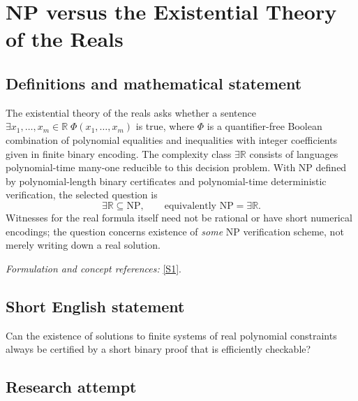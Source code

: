 \documentclass[11pt,a4paper]{article}
\newcommand{\R}{\mathbb{R}}
\newcommand{\sref}[2]{\hyperlink{source:#1:#2}{[S#2]}}
\newif\ifshowcatalogue
\newcommand{\cataloguescope}[1]{\ifshowcatalogue
 \paragraph{Exact scope in the supplied catalogue.}
 \begin{quote}\small #1\end{quote}\fi}
\numberwithin{equation}{section}
\begin{document}
\setcounter{section}{157}
\clearpage
\section{\texorpdfstring{NP versus the Existential Theory of the Reals}{NP versus the Existential Theory of the Reals}}\label{158}
\subsection{Definitions and mathematical statement}
The existential theory of the reals asks whether a sentence
$\exists x_1,\ldots,x_m\in\R\;\Phi(x_1,\ldots,x_m)$ is true, where $\Phi$ is a quantifier-free Boolean combination of polynomial equalities and inequalities with integer coefficients given in finite binary encoding. The complexity class $\exists\R$ consists of languages polynomial-time many-one reducible to this decision problem. With $\mathrm{NP}$ defined by polynomial-length binary certificates and polynomial-time deterministic verification, the selected question is
\[
 \exists\R\subseteq\mathrm{NP},\qquad\text{equivalently }\mathrm{NP}=\exists\R.
\]
Witnesses for the real formula itself need not be rational or have short numerical encodings; the question concerns existence of \emph{some} NP verification scheme, not merely writing down a real solution.
\par\smallskip\textit{Formulation and concept references:} \sref{158}{1}.
\cataloguescope{Determine whether every problem decidable in the existential theory of the reals (exists R) can be decided in nondeterministic polynomial time, i.e., decide whether NP = exists R.}
\subsection{Short English statement}
Can the existence of solutions to finite systems of real polynomial constraints always be certified by a short binary proof that is efficiently checkable?
\subsection{Research attempt}
\end{document}
